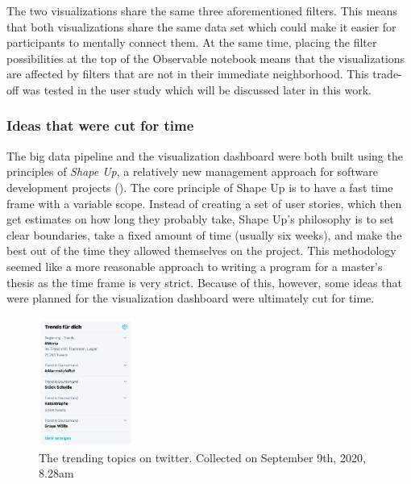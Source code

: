 The two visualizations share the same three aforementioned filters. This means that both visualizations share the same data set which could make it easier for participants to mentally connect them. At the same time, placing the filter possibilities at the top of the Observable notebook means that the visualizations are affected by filters that are not in their immediate neighborhood. This trade-off was tested in the user study which will be discussed later in this work.

\subsubsection{Ideas that were cut for time}
The big data pipeline and the visualization dashboard were both built using the principles of \emph{Shape Up}, a relatively new management approach for software development projects (\cite{singer2019}). The core principle of Shape Up is to have a fast time frame with a variable scope. Instead of creating a set of user stories, which then get estimates on how long they probably take, Shape Up's philosophy is to set clear boundaries, take a fixed amount of time (usually six weeks), and make the best out of the time they allowed themselves on the project. This methodology seemed like a more reasonable approach to writing a program for a master's thesis as the time frame is very strict.
Because of this, however, some ideas that were planned for the visualization dashboard were ultimately cut for time.

\begin{figure}
    \includegraphics[width=0.28\textwidth]{images/twitter_trends.jpg}
    \caption{The trending topics on twitter. Collected on September 9th, 2020, 8.28am}
    \label{fig:twitter_trends}
\end{figure}

